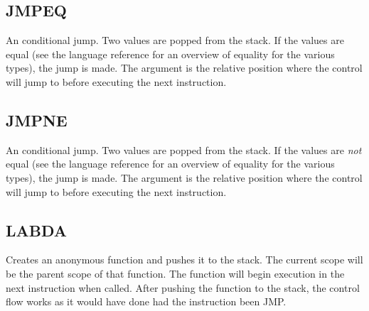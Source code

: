 \subsection{JMPEQ}
\label{sec:jmpeq}
An conditional jump. Two values are popped from the stack. If the values
are equal (see the language reference for an overview of equality for
the various types), the jump is made. The argument is the relative
position where the control will jump to before executing the next
instruction.

\subsection{JMPNE}
\label{sec:jmpne}
An conditional jump. Two values are popped from the stack. If the values
are \emph{not} equal (see the language reference for an overview of
equality for the various types), the jump is made. The argument is the
relative position where the control will jump to before executing the
next instruction.

\subsection{LABDA}
\label{sec:labda}
Creates an anonymous function and pushes it to the stack. The current
scope will be the parent scope of that function. The function will begin
execution in the next instruction when called. After pushing the
function to the stack, the control flow works as it would have done had
the instruction been JMP.
